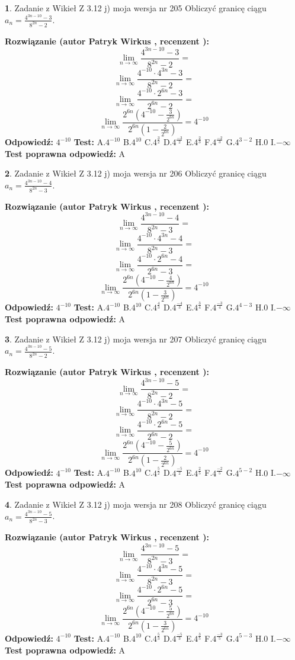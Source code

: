 \documentclass[12pt, a4paper]{article}
\theoremstyle{definition} %
\newtheorem{zad}{}
\newcommand{\zadStart}[1]{\begin{zad}#1\newline}
\newcommand{\zadStop}{\end{zad}}
\newcommand{\rozwStart}[2]{\noindent \textbf{Rozwiązanie (autor #1 , recenzent #2): }\newline}
\newcommand{\rozwStop}{\newline}
\newcommand{\odpStart}{\noindent \textbf{Odpowiedź:}\newline}
\newcommand{\odpStop}{\newline}
\newcommand{\testStart}{\noindent \textbf{Test:}\newline}
\newcommand{\testStop}{\newline}
\newcommand{\kluczStart}{\noindent \textbf{Test poprawna odpowiedź:}\newline}
\newcommand{\kluczStop}{\newline}
\begin{document}
\zadStart{Zadanie z Wikieł Z 3.12 j) moja wersja nr 205}
Obliczyć granicę ciągu $a_{n}=\frac{4^{3n-10}-3}{8^{2n}-2}$.
\zadStop
\rozwStart{Patryk Wirkus}{}
$$\lim\limits_{n\to\infty}\frac{4^{3n-10}-3}{8^{2n}-2}=$$
$$\lim\limits_{n\to\infty}\frac{4^{-10} \cdot 4^{3n}-3}{8^{2n}-2}=$$
$$\lim\limits_{n\to\infty}\frac{4^{-10} \cdot 2^{6n}-3}{2^{6n}-2}=$$
$$\lim\limits_{n\to\infty}\frac{2^{6n}(4^{-10} - \frac{3}{2^{6n}})}{2^{6n}(1-\frac{2}{2^{6n}})}= 4^{-10}$$
\rozwStop
\odpStart
$4^{-10}$
\odpStop
\testStart
A.$4^{-10}$
B.$4^{10}$
C.$4^{\frac{3}{2}}$
D.$4^{\frac{-3}{2}}$
E.$4^{\frac{2}{3}}$
F.$4^{\frac{-2}{3}}$
G.$4^{3-2}$
H.$0$
I.$-\infty$
\testStop
\kluczStart
A
\kluczStop



\zadStart{Zadanie z Wikieł Z 3.12 j) moja wersja nr 206}
Obliczyć granicę ciągu $a_{n}=\frac{4^{3n-10}-4}{8^{2n}-3}$.
\zadStop
\rozwStart{Patryk Wirkus}{}
$$\lim\limits_{n\to\infty}\frac{4^{3n-10}-4}{8^{2n}-3}=$$
$$\lim\limits_{n\to\infty}\frac{4^{-10} \cdot 4^{3n}-4}{8^{2n}-3}=$$
$$\lim\limits_{n\to\infty}\frac{4^{-10} \cdot 2^{6n}-4}{2^{6n}-3}=$$
$$\lim\limits_{n\to\infty}\frac{2^{6n}(4^{-10} - \frac{4}{2^{6n}})}{2^{6n}(1-\frac{3}{2^{6n}})}= 4^{-10}$$
\rozwStop
\odpStart
$4^{-10}$
\odpStop
\testStart
A.$4^{-10}$
B.$4^{10}$
C.$4^{\frac{4}{3}}$
D.$4^{\frac{-4}{3}}$
E.$4^{\frac{3}{4}}$
F.$4^{\frac{-3}{4}}$
G.$4^{4-3}$
H.$0$
I.$-\infty$
\testStop
\kluczStart
A
\kluczStop



\zadStart{Zadanie z Wikieł Z 3.12 j) moja wersja nr 207}
Obliczyć granicę ciągu $a_{n}=\frac{4^{3n-10}-5}{8^{2n}-2}$.
\zadStop
\rozwStart{Patryk Wirkus}{}
$$\lim\limits_{n\to\infty}\frac{4^{3n-10}-5}{8^{2n}-2}=$$
$$\lim\limits_{n\to\infty}\frac{4^{-10} \cdot 4^{3n}-5}{8^{2n}-2}=$$
$$\lim\limits_{n\to\infty}\frac{4^{-10} \cdot 2^{6n}-5}{2^{6n}-2}=$$
$$\lim\limits_{n\to\infty}\frac{2^{6n}(4^{-10} - \frac{5}{2^{6n}})}{2^{6n}(1-\frac{2}{2^{6n}})}= 4^{-10}$$
\rozwStop
\odpStart
$4^{-10}$
\odpStop
\testStart
A.$4^{-10}$
B.$4^{10}$
C.$4^{\frac{5}{2}}$
D.$4^{\frac{-5}{2}}$
E.$4^{\frac{2}{5}}$
F.$4^{\frac{-2}{5}}$
G.$4^{5-2}$
H.$0$
I.$-\infty$
\testStop
\kluczStart
A
\kluczStop



\zadStart{Zadanie z Wikieł Z 3.12 j) moja wersja nr 208}
Obliczyć granicę ciągu $a_{n}=\frac{4^{3n-10}-5}{8^{2n}-3}$.
\zadStop
\rozwStart{Patryk Wirkus}{}
$$\lim\limits_{n\to\infty}\frac{4^{3n-10}-5}{8^{2n}-3}=$$
$$\lim\limits_{n\to\infty}\frac{4^{-10} \cdot 4^{3n}-5}{8^{2n}-3}=$$
$$\lim\limits_{n\to\infty}\frac{4^{-10} \cdot 2^{6n}-5}{2^{6n}-3}=$$
$$\lim\limits_{n\to\infty}\frac{2^{6n}(4^{-10} - \frac{5}{2^{6n}})}{2^{6n}(1-\frac{3}{2^{6n}})}= 4^{-10}$$
\rozwStop
\odpStart
$4^{-10}$
\odpStop
\testStart
A.$4^{-10}$
B.$4^{10}$
C.$4^{\frac{5}{3}}$
D.$4^{\frac{-5}{3}}$
E.$4^{\frac{3}{5}}$
F.$4^{\frac{-3}{5}}$
G.$4^{5-3}$
H.$0$
I.$-\infty$
\testStop
\kluczStart
A
\kluczStop
\end{document}
